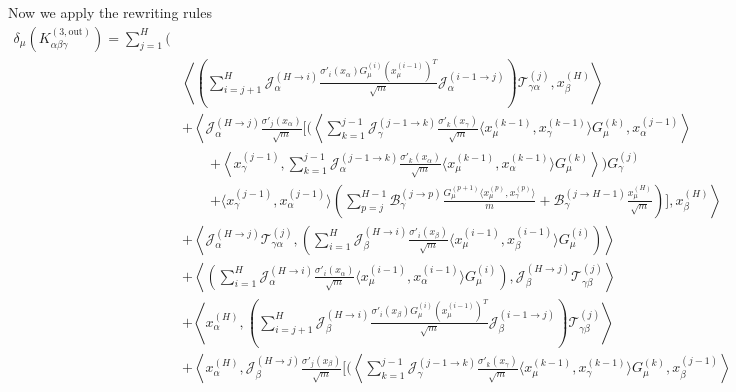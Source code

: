 \documentclass[11pt,a4paper]{article}
\theoremstyle{definition}
\begin{document}
Now we apply the rewriting rules
\begin{align}
\delta_\mu(K^{(3, \text{out})}_{\alpha\beta\gamma}) = \sum_{j=1}^{H} \Biggl( & \nonumber \\
& \left\langle \left( \sum_{i=j+1}^{H} \mathcal{J}^{(H \to i)}_{\alpha} \frac{\sigma'_{i}(x_\alpha) G^{(i)}_\mu (x^{(i-1)}_\mu)^T}{\sqrt{m}} \mathcal{J}^{(i-1 \to j)}_{\alpha} \right) \mathcal{T}^{(j)}_{\gamma\alpha}, x^{(H)}_\beta \right\rangle \nonumber \\
& + \left\langle \mathcal{J}^{(H \to j)}_{\alpha} \frac{\sigma'_{j}(x_\alpha)}{\sqrt{m}} \Biggl[ \Biggl( \left\langle \sum_{k=1}^{j-1} \mathcal{J}^{(j-1 \to k)}_{\gamma} \frac{\sigma'_{k}(x_\gamma)}{\sqrt{m}} \langle x^{(k-1)}_\mu, x^{(k-1)}_\gamma \rangle G^{(k)}_\mu, x^{(j-1)}_\alpha \right\rangle \right. \nonumber \\ 
& \qquad \left. + \left\langle x^{(j-1)}_\gamma, \sum_{k=1}^{j-1} \mathcal{J}^{(j-1 \to k)}_{\alpha} \frac{\sigma'_{k}(x_\alpha)}{\sqrt{m}} \langle x^{(k-1)}_\mu, x^{(k-1)}_\alpha \rangle G^{(k)}_\mu \right\rangle \Biggr) G^{(j)}_\gamma \right. \nonumber \\
& \qquad \left. + \langle x^{(j-1)}_\gamma, x^{(j-1)}_\alpha \rangle \left( \sum_{p=j}^{H-1} \mathcal{B}^{(j \to p)}_{\gamma} \frac{G^{(p+1)}_\mu \langle x^{(p)}_\mu, x^{(p)}_\gamma \rangle}{m} + \mathcal{B}^{(j \to H-1)}_{\gamma} \frac{x^{(H)}_\mu}{\sqrt{m}} \right) \Biggr], x^{(H)}_\beta \right\rangle \nonumber \\
& + \left\langle \mathcal{J}^{(H \to j)}_{\alpha} \mathcal{T}^{(j)}_{\gamma\alpha}, \left(\sum_{i=1}^{H} \mathcal{J}^{(H \to i)}_{\beta} \frac{\sigma'_{i}(x_\beta)}{\sqrt{m}} \langle x^{(i-1)}_\mu, x^{(i-1)}_\beta \rangle G^{(i)}_\mu\right) \right\rangle \nonumber \\
& + \left\langle \left(\sum_{i=1}^{H} \mathcal{J}^{(H \to i)}_{\alpha} \frac{\sigma'_{i}(x_\alpha)}{\sqrt{m}} \langle x^{(i-1)}_\mu, x^{(i-1)}_\alpha \rangle G^{(i)}_\mu\right), \mathcal{J}^{(H \to j)}_{\beta} \mathcal{T}^{(j)}_{\gamma\beta} \right\rangle \nonumber \\
& + \left\langle x^{(H)}_\alpha, \left( \sum_{i=j+1}^{H} \mathcal{J}^{(H \to i)}_{\beta} \frac{\sigma'_{i}(x_\beta) G^{(i)}_\mu (x^{(i-1)}_\mu)^T}{\sqrt{m}} \mathcal{J}^{(i-1 \to j)}_{\beta} \right) \mathcal{T}^{(j)}_{\gamma\beta} \right\rangle \nonumber \\
& + \left\langle x^{(H)}_\alpha, \mathcal{J}^{(H \to j)}_{\beta} \frac{\sigma'_{j}(x_\beta)}{\sqrt{m}} \Biggl[ \Biggl( \left\langle \sum_{k=1}^{j-1} \mathcal{J}^{(j-1 \to k)}_{\gamma} \frac{\sigma'_{k}(x_\gamma)}{\sqrt{m}} \langle x^{(k-1)}_\mu, x^{(k-1)}_\gamma \rangle G^{(k)}_\mu, x^{(j-1)}_\beta \right\rangle \right. \nonumber \\

\end{align}
\end{document}
